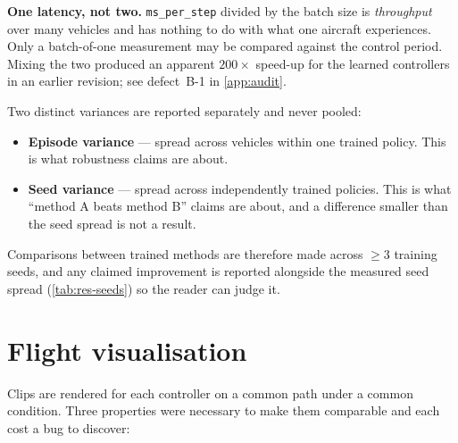 \documentclass[11pt,a4paper,twoside,openright]{report}
\makeatletter
\renewcommand{\subsection}{\FloatBarrier\old@subsection}}
\theoremstyle{plain}
\theoremstyle{definition}
\theoremstyle{remark}
\DeclareRobustCommand{\nbd}{\mbox{-}}
\makeatother
\begin{document}
	\begin{cautionbox}
		\textbf{One latency, not two.} \texttt{ms\_per\_step} divided by the batch size
		is \emph{throughput} over many vehicles and has nothing to do with what one
		aircraft experiences. Only a batch-of-one measurement may be compared against
		the control period. Mixing the two produced an apparent $200\times$ speed-up for
		the learned controllers in an earlier revision; see defect~B\nbd 1 in
		\cref{app:audit}.
	\end{cautionbox}

	\subsection{Statistical treatment}

	Two distinct variances are reported separately and never pooled:

	\begin{itemize}[nosep,leftmargin=*]
		\item \textbf{Episode variance} --- spread across vehicles within one trained
		policy. This is what robustness claims are about.
		\item \textbf{Seed variance} --- spread across independently trained policies.
		This is what ``method A beats method B'' claims are about, and a difference
		smaller than the seed spread is not a result.
	\end{itemize}

	Comparisons between trained methods are therefore made across $\ge3$ training
	seeds, and any claimed improvement is reported alongside the measured seed
	spread (\cref{tab:res-seeds}) so the reader can judge it.

	\section{Flight visualisation}

	Clips are rendered for each controller on a common path under a common
	condition. Three properties were necessary to make them comparable and each cost
	a bug to discover:
\end{document}
